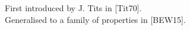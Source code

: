 \documentclass[preview]{standalone}
\begin{document}
First introduced by J. Tits in [Tit70].\\Generalised to a family of properties in [BEW15].\\
\end{document}
